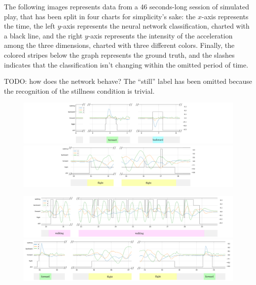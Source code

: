The following images represents data from a 46 seconds-long session of simulated play, that has been split in four charts for simplicity's sake: the $x$-axis represents the time, the left $y$-axis represents the neural network classification, charted with a black line, and the right $y$-axis represents the intensity of the acceleration among the three dimensions, charted with three different colors. Finally, the colored stripes below the graph represents the ground truth, and the slashes indicates that the classification isn't changing within the omitted period of time.
\bigbreak

TODO: how does the network behave?
The ``still'' label has been omitted because the recognition of the stillness condition is trivial.

\clearpage
\begin{figure}
	\includegraphics[width=\textwidth]{img/plots/session/1.png}
	\vspace{2cm}

	\includegraphics[width=\textwidth]{img/plots/session/2.png}
\end{figure}
\clearpage

\clearpage
\begin{figure}
	\includegraphics[width=\textwidth]{img/plots/session/3.png}
	\vspace{2cm}

	\includegraphics[width=\textwidth]{img/plots/session/4.png}
\end{figure}
\clearpage
